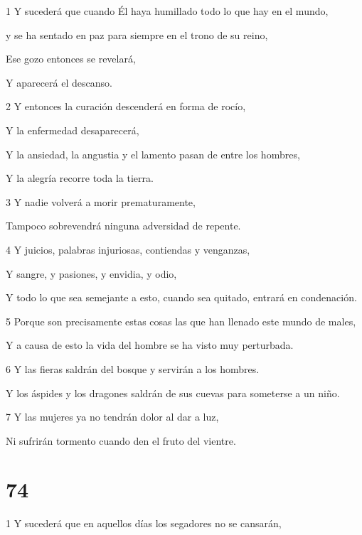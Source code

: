 \par 1 Y sucederá que cuando Él haya humillado todo lo que hay en el mundo,

y se ha sentado en paz para siempre en el trono de su reino,

\par Ese gozo entonces se revelará,

\par Y aparecerá el descanso.

\par 2 Y entonces la curación descenderá en forma de rocío,

\par Y la enfermedad desaparecerá,

Y la ansiedad, la angustia y el lamento pasan de entre los hombres,

Y la alegría recorre toda la tierra.

\par 3 Y nadie volverá a morir prematuramente,

\par Tampoco sobrevendrá ninguna adversidad de repente.

\par 4 Y juicios, palabras injuriosas, contiendas y venganzas,

\par Y sangre, y pasiones, y envidia, y odio,

Y todo lo que sea semejante a esto, cuando sea quitado, entrará en condenación.

\par 5 Porque son precisamente estas cosas las que han llenado este mundo de males,

Y a causa de esto la vida del hombre se ha visto muy perturbada.

\par 6 Y las fieras saldrán del bosque y servirán a los hombres.

Y los áspides y los dragones saldrán de sus cuevas para someterse a un niño.

\par 7 Y las mujeres ya no tendrán dolor al dar a luz,

Ni sufrirán tormento cuando den el fruto del vientre.

\chapter{74}

\par 1 Y sucederá que en aquellos días los segadores no se cansarán,

